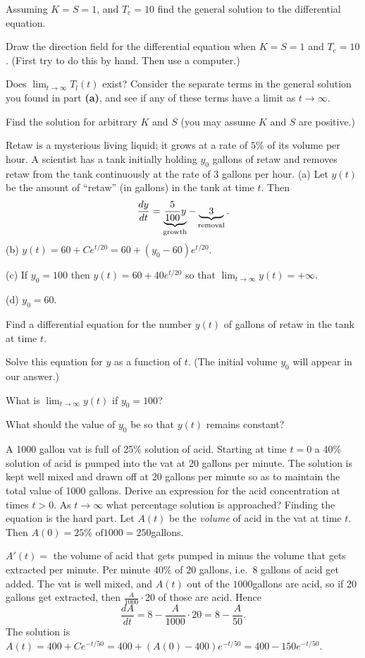 \begin{multicols}{2}
\subprob Assuming $K=S=1$, and $T_e=10$ find the general solution to the differential
equation.

\subprob Draw the direction field for the differential equation when $K=S=1$ and $T_e
= 10$.  (First try to do this by hand.  Then use a computer.)

\subprob Does $\lim_{t\to\infty} T_l(t)$ exist?  Consider the separate terms in the
general solution you found in part \textbf{(a)}, and see if any of these terms have a
limit as $t\to\infty$.

\subprob Find the solution for arbitrary $K$ and $S$ (you may assume $K$ and $S$ are
positive.)


\problem Retaw is a mysterious living liquid; it grows at a rate of $5\%$ of its %
volume per hour.  A scientist has a tank initially holding $y_0$ gallons of
retaw and removes retaw from the tank continuously at the rate of 3 gallons per
hour.
\answer %
(a) Let $y(t)$ be the amount of ``retaw'' (in gallons) in the tank at time
$t$.  Then
\[
\frac{dy}{dt} = \underbrace{\frac{5}{100}y}_{\rm growth}
- \underbrace{\quad3\quad}_{\rm removal}.
\]
(b) $y(t) = 60+ Ce^{t/20} = 60+(y_0 - 60)e^{t/20}$.

(c) If $y_0 = 100$ then $y(t) = 60 + 40 e^{t/20}$ so that
$\lim_{t\to\infty} y(t) = +\infty$.

(d) $y_0 = 60$.
\endanswer

\subprob Find a differential equation for the number $y(t)$ of gallons of
retaw in the tank at time $t$.

\subprob Solve this equation for $y$ as a function of $t$. (The initial
volume $y_0$ will appear in our answer.)

\subprob What is $\lim_{t\to\infty} y(t)$ if $y_0=100$?

\subprob What should the value of $y_0$ be so that $y(t)$ remains constant?


\problem A 1000 gallon vat is full of 25\% solution of acid. Starting at %
time $t=0$ a 40\% solution of acid is pumped into the vat at 20 gallons per
minute. The solution is kept well mixed and drawn off at 20 gallons per
minute so as to maintain the total value of 1000 gallons. Derive an
expression for the acid concentration at times $t>0$. As $t\to\infty$ what
percentage solution is approached?
\answer %
Finding the equation is the hard part.  Let $A(t)$ be the 
\emph{volume} of acid in the vat at time $t$.  Then $A(0) = 25\%\text{ of
}1000 = 250$gallons.

$A'(t) = $ the volume of acid that gets pumped in minus the volume that gets
extracted per minute.  Per minute $40\%$ of $20$ gallons, i.e.\ 8 gallons of
acid get added.  The vat is well mixed, and $A(t)$ out of the $1000$gallons
are acid, so if 20 gallons get extracted, then $\frac{A}{1000}\cdot20$ of
those are acid.  Hence
\[
\frac{dA}{dt} = 8 - \frac{A}{1000}\cdot20 = 8-\frac{A}{50}.
\]
The solution is $A(t) = 400 + Ce^{-t/50} = 400 + (A(0)-400)e^{-t/50} = 400
-150 e^{-t/50}$.


\end{multicols}
